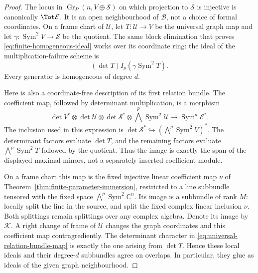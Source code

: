 \documentclass[11pt,reqno]{amsart}
\numberwithin{equation}{section}
\theoremstyle{definition}\newtheorem{definition}[theorem]{Definition}
\theoremstyle{remark}\newtheorem{remark}[theorem]{Remark}
\newcommand{\C}{\mathbb C}\newcommand{\Q}{\mathbb Q}
\DeclareMathOperator{\Sym}{Sym}\DeclareMathOperator{\Gr}{Gr}
\begin{document}
\begin{proof}
The locus in \(\Gr_P(n,V\oplus\mathcal S)\) on which projection
to \(\mathcal S\) is injective is canonically \(\Tot\mathcal E\).
It is an open neighbourhood of \(\mathcal B\), not a choice of
formal coordinates.  On a frame chart of \(\mathcal U\), let
\(T:\mathcal U\to V\) be the universal graph map and let
\(\gamma:\Sym^2V\to\mathcal S\) be the quotient.  The same
block elimination that proves
\eqref{eq:finite-homogeneous-ideal} works over its coordinate ring:
the ideal of the multiplication-failure scheme is
\[
                   (\det T)I_p(\gamma\Sym^2T).
\]
Every generator is homogeneous of degree \(d\).

Here is also a coordinate-free description of its first relation
bundle.  The coefficient map, followed by determinant multiplication,
is a morphism
\begin{equation}\label{eq:universal-relation-bundle-map}
 \det V^*\otimes\det\mathcal U\otimes\det\mathcal S^*
       \otimes\bigwedge^p\Sym^2\mathcal U
 \longrightarrow \Sym^d\mathcal E^*.
\end{equation}
The inclusion used in this expression is
\(\det\mathcal S^*\hookrightarrow(\bigwedge^p\Sym^2V)^*\).
The determinant factors evaluate \(\det T\), and the remaining
factors evaluate \(\bigwedge^p\Sym^2T\) followed by the quotient.
Thus the image is exactly the span of the displayed maximal minors,
not a separately inserted coefficient module.

On a frame chart this map is the fixed injective linear coefficient
map \(\nu\) of Theorem~\ref{thm:finite-parameter-immersion},
restricted to a line subbundle tensored with the fixed space
\(\bigwedge^p\Sym^2\C^n\).  Its image is a subbundle of rank
\(M\): locally split the line in the source, and split the fixed
complex linear inclusion \(\nu\).  Both splittings remain
splittings over any complex algebra.  Denote its image by
\(\mathcal K\).  A right change of frame of \(\mathcal U\)
changes the graph coordinates and this coefficient map
contragrediently.  The determinant character in
\eqref{eq:universal-relation-bundle-map} is exactly the one arising
from \(\det T\).  Hence these local ideals and their degree-\(d\)
subbundles agree on overlaps.  In particular, they glue as ideals
of the given graph neighbourhood.


\end{proof}
\end{document}
